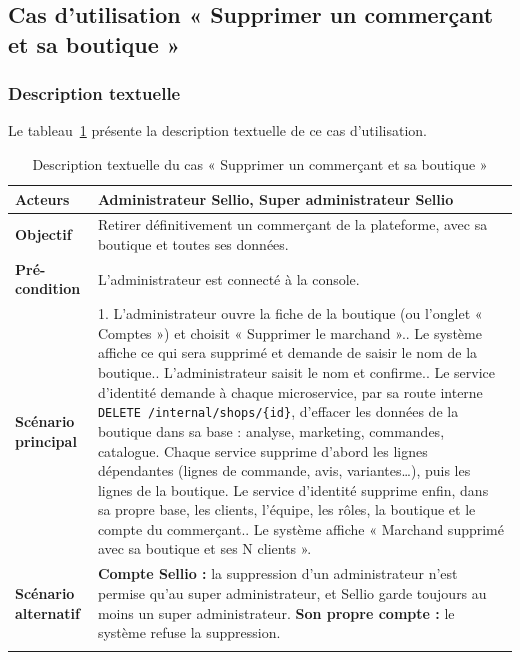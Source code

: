 \subsection{Cas d'utilisation « Supprimer un commerçant et sa boutique »}
\subsubsection{Description textuelle}
Le tableau~\ref{tab:uc-suppression} présente la description textuelle de ce cas d'utilisation.
\renewcommand{\arraystretch}{1.5}
\begin{longtable}{|p{4cm}|p{11cm}|}
\hline
\textbf{Acteurs} & Administrateur Sellio, Super administrateur Sellio \\
\hline
\textbf{Objectif} & Retirer définitivement un commerçant de la plateforme, avec sa boutique et toutes ses données. \\
\hline
\textbf{Pré-condition} & L'administrateur est connecté à la console. \\
\hline
\textbf{Scénario principal} &
1. L'administrateur ouvre la fiche de la boutique (ou l'onglet « Comptes ») et choisit « Supprimer le marchand ».\newline
2. Le système affiche ce qui sera supprimé et demande de saisir le nom de la boutique.\newline
3. L'administrateur saisit le nom et confirme.\newline
4. Le service d'identité demande à chaque microservice, par sa route interne \texttt{DELETE /internal/shops/\{id\}}, d'effacer les données de la boutique dans sa base : analyse, marketing, commandes, catalogue. Chaque service supprime d'abord les lignes dépendantes (lignes de commande, avis, variantes\dots), puis les lignes de la boutique. Le service d'identité supprime enfin, dans sa propre base, les clients, l'équipe, les rôles, la boutique et le compte du commerçant.\newline
5. Le système affiche « Marchand supprimé avec sa boutique et ses N clients ». \\
\hline
\textbf{Scénario alternatif} &
\textbf{Compte Sellio :} la suppression d'un administrateur n'est permise qu'au super administrateur, et Sellio garde toujours au moins un super administrateur.\newline
\textbf{Son propre compte :} le système refuse la suppression. \\
\hline
\caption{Description textuelle du cas « Supprimer un commerçant et sa boutique »}
\label{tab:uc-suppression}
\end{longtable}

